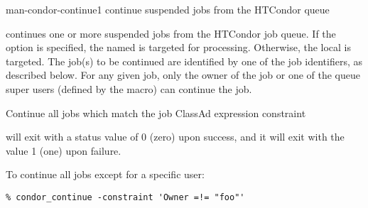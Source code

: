 \begin{ManPage}{}{man-condor-continue}{1}
{continue suspended jobs from the HTCondor queue}

\Synopsis {}
\ToolArgsBase

\ToolDebugOption
\ToolLocate
{}


\Description

 continues one or more suspended jobs from the HTCondor job queue.  
If the  option is specified, the named  is targeted
for processing.  
Otherwise, the local  is targeted.
The job(s) to be continued are identified by one of the job identifiers,
as described below.
For any given job, only the owner of the job or one of the queue super users
(defined by the  macro) can continue the job.

\begin{Options}
	\ToolArgsBaseDesc
	\ToolLocateDesc
    \ToolDebugDesc
	 {Continue all jobs which match
	                the job ClassAd expression constraint}
\end{Options}

\ExitStatus

 will exit with a status value of 0 (zero) upon success,
and it will exit with the value 1 (one) upon failure.

\Examples
To continue all jobs except for a specific user:
\footnotesize
\begin{verbatim}
% condor_continue -constraint 'Owner =!= "foo"'
\end{verbatim}
\normalsize

\end{ManPage}
